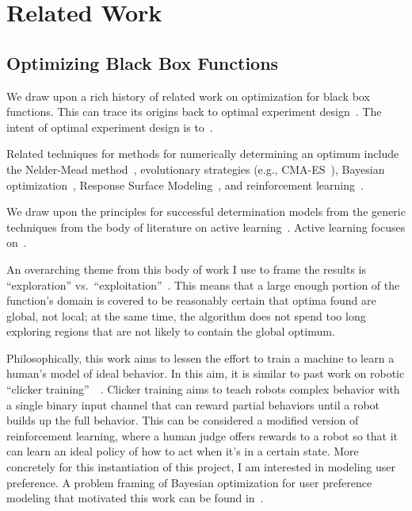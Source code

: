 \section{Related Work}

\subsection{Optimizing Black Box Functions}

We draw upon a rich history of related work on optimization for black box functions.
This can trace its origins back to optimal experiment design~\cite{box_empirical_1987}.
The intent of optimal experiment design is to~.

Related techniques for methods for numerically determining an optimum include 
the Nelder-Mead method~\cite{nelder_simplex_1965},
evolutionary strategies (e.g., CMA-ES~\cite{hansen_adapting_1996}),
Bayesian optimization~\cite{brochu_tutorial_2010},
Response Surface Modeling~\cite{box_empirical_1987},
and reinforcement learning~\cite{sutton_reinforcement_1998}.

We draw upon the principles for successful determination models from the generic techniques from the body of literature on active learning~\cite{cohn_active_1996,settles_active_2010}.
Active learning focuses on~.

An overarching theme from this body of work I use to frame the results is ``exploration'' vs.\ ``exploitation''~\cite{sutton_reinforcement_1998}.
This means that a large enough portion of the function's domain is covered to be reasonably certain that optima found are global, not local;
at the same time, the algorithm does not spend too long exploring regions that are not likely to contain the global optimum.

Philosophically, this work aims to lessen the effort to train a machine to learn a human's model of ideal behavior.
In this aim, it is similar to past work on robotic ``clicker training''~\cite{kaplan_robotic_2002}~\cite{grollman_dogged_2007}.
Clicker training aims to teach robots complex behavior with a single binary input channel that can reward partial behaviors until a robot builds up the full behavior.
This can be considered a modified version of reinforcement learning, where a human judge offers rewards to a robot so that it can learn an ideal policy of how to act when it's in a certain state.
More concretely for this instantiation of this project, I am interested in modeling user preference.
A problem framing of Bayesian optimization for user preference modeling that motivated this work can be found in~\cite{brochu_tutorial_2010}.

